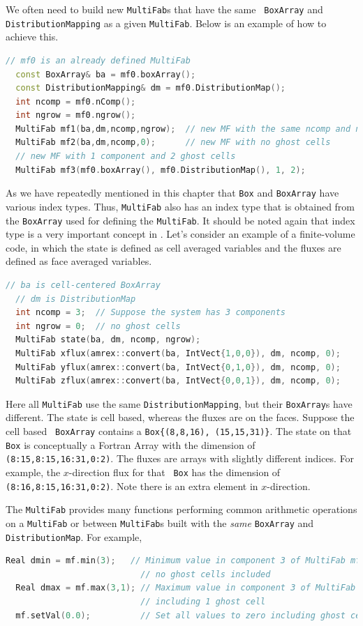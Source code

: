 {{{We often need to build new {\tt MultiFab}s that have the same {\tt
  BoxArray} and {\tt DistributionMapping} as a given {\tt MultiFab}.
Below is an example of how to achieve this.
\begin{lstlisting}[language=cpp]
  // mf0 is an already defined MultiFab
  const BoxArray& ba = mf0.boxArray();
  const DistributionMapping& dm = mf0.DistributionMap();
  int ncomp = mf0.nComp();
  int ngrow = mf0.ngrow();
  MultiFab mf1(ba,dm,ncomp,ngrow);  // new MF with the same ncomp and ngrow
  MultiFab mf2(ba,dm,ncomp,0);      // new MF with no ghost cells
  // new MF with 1 component and 2 ghost cells
  MultiFab mf3(mf0.boxArray(), mf0.DistributionMap(), 1, 2);               
\end{lstlisting}

As we have repeatedly mentioned in this chapter that {\tt Box} and
{\tt BoxArray} have various index types.  Thus, {\tt MultiFab} also
has an index type that is obtained from the {\tt BoxArray} used for
defining the {\tt MultiFab}.  It should be noted again that index type
is a very important concept in \amrex.  Let's consider an example of a
finite-volume code, in which the state is defined as cell averaged
variables and the fluxes are defined as face averaged variables.
\begin{lstlisting}[language=cpp]
  // ba is cell-centered BoxArray
  // dm is DistributionMap
  int ncomp = 3;  // Suppose the system has 3 components
  int ngrow = 0;  // no ghost cells
  MultiFab state(ba, dm, ncomp, ngrow);
  MultiFab xflux(amrex::convert(ba, IntVect{1,0,0}), dm, ncomp, 0);
  MultiFab yflux(amrex::convert(ba, IntVect{0,1,0}), dm, ncomp, 0);
  MultiFab zflux(amrex::convert(ba, IntVect{0,0,1}), dm, ncomp, 0);
\end{lstlisting}
Here all {\tt MultiFab} use the same {\tt DistributionMapping}, but
their {\tt BoxArray}s have different.  The state is cell based,
whereas the fluxes are on the faces.  Suppose the cell based {\tt
  BoxArray} contains a {\tt Box\{(8,8,16), (15,15,31)\}}.  The state
on that {\tt Box} is conceptually a Fortran Array with the dimension
of {\tt (8:15,8:15,16:31,0:2)}.  The fluxes are arrays with slightly
different indices.  For example, the $x$-direction flux for that {\tt
  Box} has the dimension of {\tt (8:16,8:15,16:31,0:2)}.  Note there is
an extra element in $x$-direction.  

The {\tt MultiFab} provides many functions performing common
arithmetic operations on a {\tt MultiFab} or between {\tt MultiFab}s
built with the {\emph{same}} {\tt BoxArray} and {\tt DistributionMap}.
For example,
\begin{lstlisting}[language=cpp]
  Real dmin = mf.min(3);   // Minimum value in component 3 of MultiFab mf
                           // no ghost cells included
  Real dmax = mf.max(3,1); // Maximum value in component 3 of MultiFab mf
                           // including 1 ghost cell
  mf.setVal(0.0);          // Set all values to zero including ghost cells


\end{lstlisting}}}}

